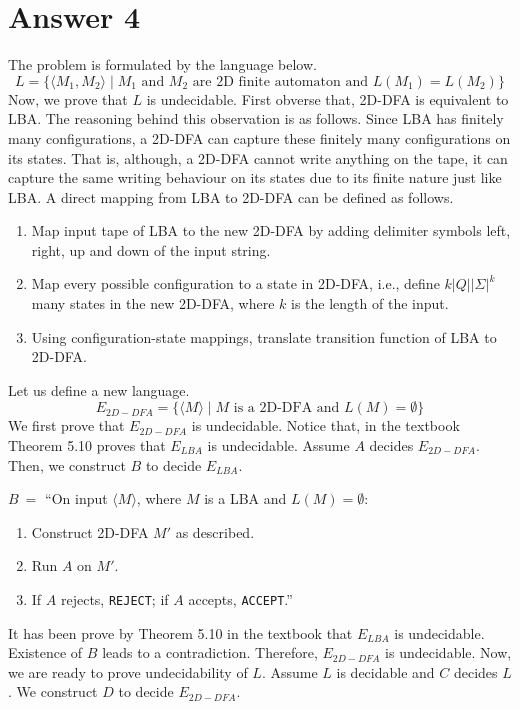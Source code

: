 \documentclass[12pt]{article}
\begin{document}
\section*{Answer 4}

The problem is formulated by the language below.
\[
L = \{ \langle M_1, M_2 \rangle \mid M_1 \text{ and } M_2 \text{ are 2D finite automaton and } L(M_1) = L(M_2)\}
\]
Now, we prove that $L$ is undecidable. First obverse that, 2D-DFA is equivalent to LBA. The reasoning behind this observation is as follows. Since LBA has finitely many configurations, a 2D-DFA can capture these finitely many configurations on its states. That is, although, a 2D-DFA cannot write anything on the tape, it can capture the same writing behaviour on its states due to its finite nature just like LBA. A direct mapping from LBA to 2D-DFA can be defined as follows.

\begin{enumerate}
	\item Map input tape of LBA to the new 2D-DFA by adding delimiter symbols left, right, up and down of the input string.
	\item Map every possible configuration to a state in 2D-DFA, i.e., define $k|Q||\Sigma|^{k}$ many states in the new 2D-DFA, where $k$ is the length of the input.
	\item Using configuration-state mappings, translate transition function of LBA to 2D-DFA.
\end{enumerate}

Let us define a new language.
\[
E_{2D-DFA} = \{\langle M \rangle \mid M \text{ is a 2D-DFA and } L(M) = \emptyset\}
\]
We first prove that $E_{2D-DFA}$ is undecidable. Notice that, in the textbook Theorem 5.10 proves that $E_{LBA}$ is undecidable. Assume $A$ decides $E_{2D-DFA}$. Then, we construct $B$ to decide $E_{LBA}$.


$B \ =$ ``On input $\langle M \rangle$, where $M$ is a LBA and $L(M) = \emptyset$:
\begin{enumerate}[leftmargin=2.50cm]
	\item Construct 2D-DFA $M'$ as described.
	\item Run $A$ on $M'$.
	\item If $A$ rejects, \texttt{REJECT}; if $A$ accepts, \texttt{ACCEPT}.”
\end{enumerate}

It has been prove by Theorem 5.10 in the textbook that $E_{LBA}$ is undecidable. Existence of $B$ leads to a contradiction. Therefore, $E_{2D-DFA}$ is undecidable. Now, we are ready to prove undecidability of $L$. Assume $L$ is decidable and $C$ decides $L$. We construct $D$ to decide $E_{2D-DFA}$.
\end{document}
